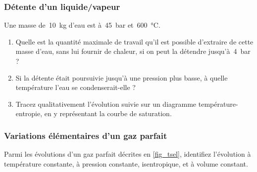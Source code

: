 \begin{boiboiboite}
	\propeau
	\propair
	\isentropiques
	\deltaentropie
\end{boiboiboite}

\subsubsection{Détente d’un liquide/vapeur}

	Une masse de~\SI{10}{\kilogram} d’eau est à~\SI{45}{\bar} et~\SI{600}{\degreeCelsius}.
	
	\begin{enumerate}
		\item Quelle est la quantité maximale de travail qu’il est possible d’extraire de cette masse d’eau, sans lui fournir de chaleur, si on peut la détendre jusqu’à~\SI{4}{\bar} ?
		\item Si la détente était poursuivie jusqu’à une pression plus basse, à quelle température l’eau se condenserait-elle ?
		\item Tracez qualitativement l’évolution suivie sur un diagramme température-entropie, en y représentant la courbe de saturation.
	\end{enumerate}

\subsubsection{Variations élémentaires d’un gaz parfait}

	Parmi les évolutions d’un gaz parfait décrites en \cref{fig_tsel}, identifiez l’évolution à température constante, à pression constante, isentropique, et à volume constant.	
	
